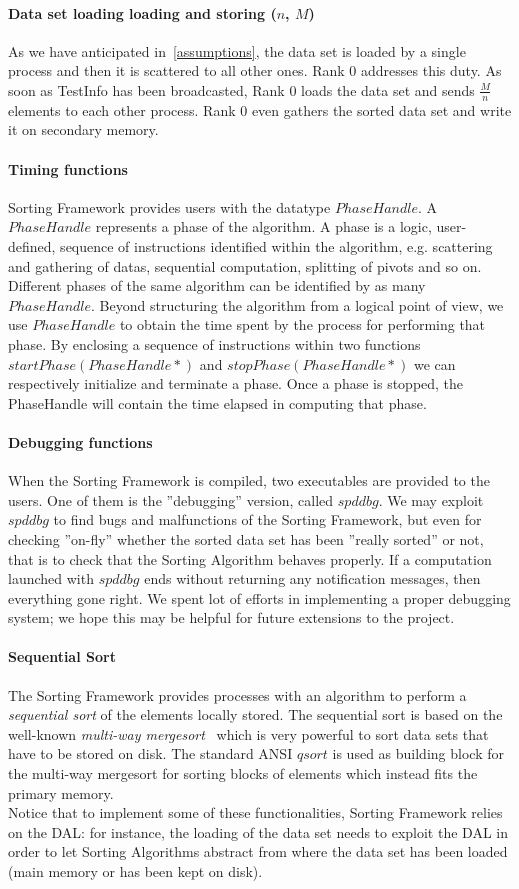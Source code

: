 \paragraph{Data set loading loading and storing ($n$, $M$)} As we have anticipated in~\ref{assumptions}, the data set is loaded by a single process and then it is scattered to all other ones. Rank $0$ addresses this duty. As soon as TestInfo has been broadcasted, Rank $0$ loads the data set and sends $\frac{M}{n}$ elements to each other process. Rank $0$ even gathers the sorted data set and write it on secondary memory.

\paragraph{Timing functions} Sorting Framework provides users with the datatype $PhaseHandle$. A $PhaseHandle$ represents a phase of the algorithm. A phase is a logic, user-defined, sequence of instructions identified within the algorithm,  e.g. scattering and gathering of datas, sequential computation, splitting of pivots and so on. Different phases of the same algorithm can be identified by as many $PhaseHandle$. Beyond structuring the algorithm from a logical point of view, we use $PhaseHandle$ to obtain the time spent by the process for performing that phase. By enclosing a sequence of instructions within two functions $startPhase(PhaseHandle*)$ and $stopPhase(PhaseHandle*)$ we can respectively initialize and terminate a phase. Once a phase is stopped, the PhaseHandle will contain the time elapsed in computing that phase. 

\paragraph{Debugging functions} When the Sorting Framework is compiled, two executables are provided to the users. One of them is the ''debugging'' version, called $spddbg$. We may exploit $spddbg$ to find bugs and malfunctions of the Sorting Framework, but even for checking ''on-fly'' whether the sorted data set has been ''really sorted'' or not, that is to check that the Sorting Algorithm behaves properly. If a computation launched with $spddbg$ ends without returning any notification messages, then everything gone right. We spent lot of efforts in implementing a proper debugging system; we hope this may be helpful for future extensions to the project. 

\paragraph{Sequential Sort} The Sorting Framework provides processes with an algorithm to perform a \textit{sequential sort} of the elements locally stored. The sequential sort is based on the well-known \textit{multi-way mergesort}~\cite{FERR} which is very powerful to sort data sets that have to be stored on disk. The standard ANSI $qsort$ is used as building block for the multi-way mergesort for sorting blocks of elements which instead fits the primary memory. \\

Notice that to implement some of these functionalities, Sorting Framework relies on the DAL: for instance, the loading of the data set needs to exploit the DAL in order to let Sorting Algorithms abstract from where the data set has been loaded (main memory or has been kept on disk).

